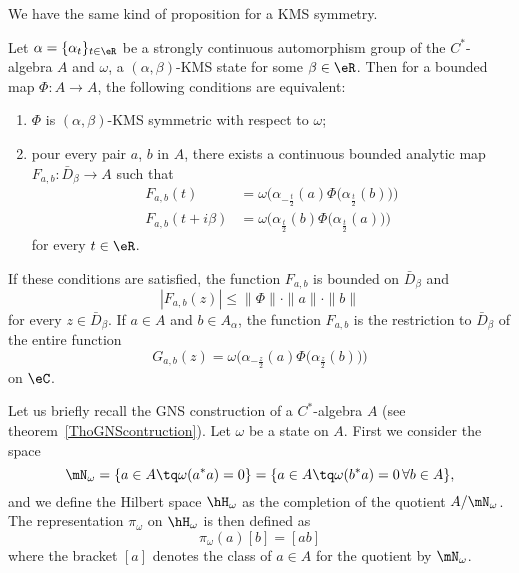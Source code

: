 We have the same kind of proposition for a KMS symmetry.

\begin{proposition}		\label{PropFabcomegaKSM}
	Let $\alpha=\{ \alpha_t \}_{t\in\eR}$ be a strongly continuous automorphism group of the $C^*$-algebra $A$ and $\omega$, a $(\alpha,\beta)$-KMS state for some $\beta\in\eR$. Then for a bounded map $\Phi\colon A\to A$, the following conditions are equivalent:
	\begin{enumerate}
		\item
			$\Phi$ is $(\alpha,\beta)$-KMS symmetric with respect to $\omega$;
		\item
			pour every pair $a$, $b$ in $A$, there exists a continuous bounded analytic map $F_{a,b}\colon \bar D_{\beta}\to A$ such that
			\begin{subequations}
				\begin{align}
					F_{a,b}(t)&=\omega\Big( \alpha_{-\frac{ t }{2}}(a)\Phi\big( \alpha_{\frac{ t }{ 2 }}(b) \big) \Big)\\
					F_{a,b}(t+i\beta)&=\omega\Big( \alpha_{\frac{ t }{2}}(b)\Phi\big( \alpha_{\frac{ t }{ 2 }}(a) \big) \Big)	\label{subEqFabitbhi}
				\end{align}
			\end{subequations}
			for every $t\in\eR$.
	\end{enumerate}
	If these conditions are satisfied, the function $F_{a,b}$ is bounded on $\bar D_{\beta}$ and
	\begin{equation}
		| F_{a,b}(z) |\leq\| \Phi \|\cdot\| a \|\cdot\| b \|
	\end{equation}
	for every $z\in\bar D_{\beta}$. If $a\in A$ and $b\in A_{\alpha}$, the function $F_{a,b}$ is the restriction to $\bar D_{\beta}$ of the entire function
	\begin{equation}
		G_{a,b}(z)=\omega\Big( \alpha_{-\frac{ z }{2}}(a)\Phi\big( \alpha_{\frac{ z }{2}}(b) \big) \Big)
	\end{equation}
	on $\eC$.
\end{proposition}

Let us briefly recall the GNS construction of a $C^*$-algebra $A$ (see theorem~\ref{ThoGNScontruction}). Let $\omega$ be a state on $A$. First we consider the space
\begin{equation}
	\mN_{\omega}=\{ a\in A\tq\omega(a^*a)=0 \}=\{ a\in A\tq \omega(b^*a)=0\,\forall b\in A \},
\end{equation}
and we define the Hilbert space $\hH_{\omega}$ as the completion of the quotient $A/\mN_{\omega}$. The representation $\pi_{\omega}$ on $\hH_{\omega}$ is then defined as
\begin{equation}
	\pi_{\omega}(a)[b]=[ab]
\end{equation}
where the bracket $[a]$ denotes the class of $a\in A$ for the quotient by $\mN_{\omega}$.

